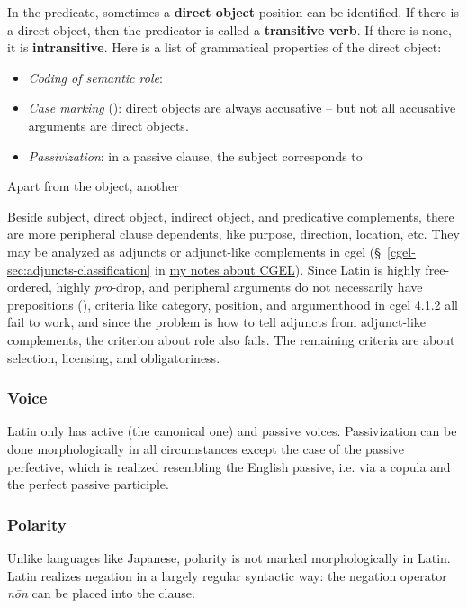 \documentclass{article}
\newcommand*{\citesec}[1]{\S~{#1}}
\newcommand*{\concept}[1]{\textbf{#1}}
\newcommand*{\term}[1]{\emph{#1}}
\newcommand*{\corpus}[1]{\emph{#1}}
\newcommand{\cgel}{\href{../English/cambridge.pdf}{my notes about CGEL}}
\begin{document}
In the predicate, sometimes a \concept{direct object} position can be identified.
If there is a direct object, then the predicator is called a \concept{transitive verb}.
If there is none, it is \concept{intransitive}.
Here is a list of grammatical properties of the direct object:
\begin{itemize}
    \item \emph{Coding of semantic role}: 
    \item \emph{Case marking} (): direct objects are always accusative -- 
    but not all accusative arguments are direct objects.
    \item \emph{Passivization}: in a passive clause, the subject corresponds to 
\end{itemize}

Apart from the object, another 

Beside subject, direct object, indirect object, and predicative complements,
there are more peripheral clause dependents,
like purpose, direction, location, etc.
They may be analyzed as adjuncts or adjunct-like complements in 
\ac{cgel} (\citesec{\ref{cgel-sec:adjuncts-classification}} in \cgel).
Since Latin is highly free-ordered, 
highly \term{pro}-drop,
and peripheral arguments do not necessarily have prepositions (),
criteria like category, position, and argumenthood in \ac{cgel} 4.1.2
all fail to work,
and since the problem is how to tell adjuncts from adjunct-like complements,
the criterion about role also fails.
The remaining criteria are about selection, licensing, and obligatoriness.

\subsubsection{Voice}\label{sec:voice-abs}

Latin only has active (the canonical one) and passive voices.
Passivization can be done morphologically in all circumstances 
except the case of the passive perfective,
which is realized resembling the English passive,
i.e. via a copula and the perfect passive participle.


\subsubsection{Polarity}\label{sec:polarity-abs}

Unlike languages like Japanese, polarity is not marked morphologically in Latin.
Latin realizes negation in a largely regular syntactic way: 
the negation operator \corpus{n\={o}n} can be placed into the clause.
\end{document}
